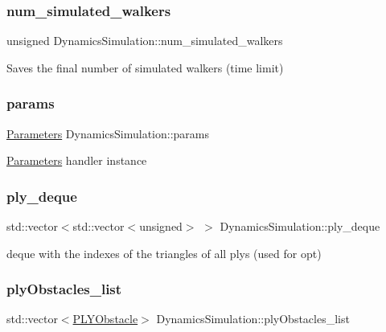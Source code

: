 \subsubsection{\texorpdfstring{num\+\_\+simulated\+\_\+walkers}{num\_simulated\_walkers}}
{\footnotesize\ttfamily unsigned Dynamics\+Simulation\+::num\+\_\+simulated\+\_\+walkers}

Saves the final number of simulated walkers (time limit) \mbox{\label{class_dynamics_simulation_a67cd4cd9a2e7cd2339c98dae60e66dde}} 
\subsubsection{\texorpdfstring{params}{params}}
{\footnotesize\ttfamily \hyperlink{class_parameters}{Parameters} Dynamics\+Simulation\+::params}

\hyperlink{class_parameters}{Parameters} handler instance \mbox{\label{class_dynamics_simulation_ad920a07f2c8c85fab7a1aec983c15b20}} 
\subsubsection{\texorpdfstring{ply\+\_\+deque}{ply\_deque}}
{\footnotesize\ttfamily std\+::vector$<$std\+::vector$<$unsigned$>$ $>$ Dynamics\+Simulation\+::ply\+\_\+deque}

deque with the indexes of the triangles of all ply\textquotesingle{}s (used for opt) \mbox{\label{class_dynamics_simulation_a4e7e45353d8485033987e2f3d9f045e6}} 
\subsubsection{\texorpdfstring{ply\+Obstacles\+\_\+list}{plyObstacles\_list}}
{\footnotesize\ttfamily std\+::vector$<$\hyperlink{class_p_l_y_obstacle}{P\+L\+Y\+Obstacle}$>$ Dynamics\+Simulation\+::ply\+Obstacles\+\_\+list}

